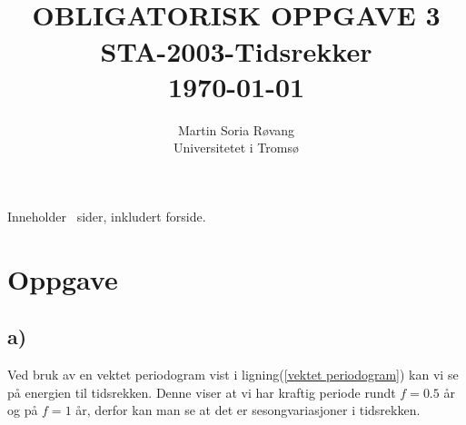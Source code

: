 
\usepackage{amssymb}
\usepackage{gensymb}
\usepackage{amsmath}
\usepackage[section]{placeins}



{\selectfont
\title{ \normalsize \textsc{}
		\\ [1.0cm] %
        \LARGE \textbf{\uppercase{Obligatorisk Oppgave 3}
        \HRule{0.5pt} \\ [0.5cm]
        STA-2003-Tidsrekker
        \\
		\normalsize \today \vspace*{5\baselineskip}}
		}

        \date{}
\author{
		Martin Soria Røvang \\ 
        Universitetet i Tromsø\\}

\clearpage\maketitle
\vspace{0.2\textheight}
{\centering
Inneholder \pageref{LastPage} \, sider, inkludert forside.\par
}}
\thispagestyle{empty}

\newpage
\tableofcontents

\newpage

\section{Oppgave}
\subsection{a)}

Ved bruk av en vektet periodogram vist i ligning(\ref{vektet periodogram}) kan vi se på energien til tidsrekken. Denne viser at vi har kraftig periode rundt $f = 0.5$ år og på $f = 1$ år, derfor kan man se at det er sesongvariasjoner i tidsrekken.

